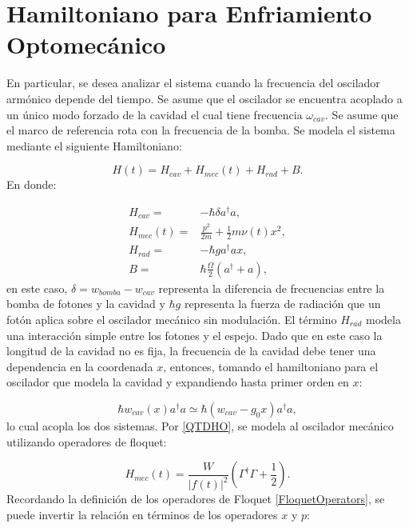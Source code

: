 \documentclass[a4paper,10pt]{report}
\begin{document}
\section{Hamiltoniano para Enfriamiento Optomecánico}

En particular, se desea analizar el sistema cuando la frecuencia del oscilador armónico depende del tiempo. Se asume que el oscilador se encuentra acoplado a un único modo forzado de la cavidad el cual tiene frecuencia $\omega_{cav}$. Se asume que el marco de referencia rota con la frecuencia de la bomba. Se modela el sistema mediante el siguiente Hamiltoniano\cite{BarberisLC}:

\begin{equation}
H(t) = H_{cav} + H_{mec}(t) + H_{rad} + B.
\end{equation} En donde:

\begin{align}
H_{cav} =& -\hbar \delta a^\dagger a,\\
H_{mec}(t) =& \frac{p^2}{2m} + \frac{1}{2}m \nu (t) x^2,\\
H_{rad} =& -\hbar g a^\dagger a x,\\
B =& \hbar\frac{\Omega}{2}(a^\dagger + a),
\end{align} en este caso, $\delta = w_{bomba} - w_{cav}$ representa la diferencia de frecuencias entre la bomba de fotones y la cavidad y $\hbar g$ representa la fuerza de radiación que un fotón aplica sobre el oscilador mecánico sin modulación. El término $H_{rad}$ modela una interacción simple entre los fotones y el espejo. Dado que en este caso la longitud de la cavidad no es fija, la frecuencia de la cavidad debe tener una dependencia en la coordenada $x$, entonces, tomando el hamiltoniano para el oscilador que modela la cavidad y expandiendo hasta primer orden en $x$\cite{KippenberCO}:

\begin{equation}
\hbar w_{cav}(x) a^\dagger a \simeq \hbar(w_{cav}-g_0x)a^\dagger a,
\end{equation}lo cual acopla los dos sistemas. Por \ref{QTDHO}, se modela al oscilador mecánico utilizando operadores de floquet:

\begin{equation}
H_{mec}(t) = \frac{W}{|f(t)|^2}(\Gamma^\dagger \Gamma + \frac{1}{2}).
\end{equation} Recordando la definición de los operadores de Floquet \ref{FloquetOperators}, se puede invertir la relación en términos de los operadores $x$ y $p$:
\end{document}

